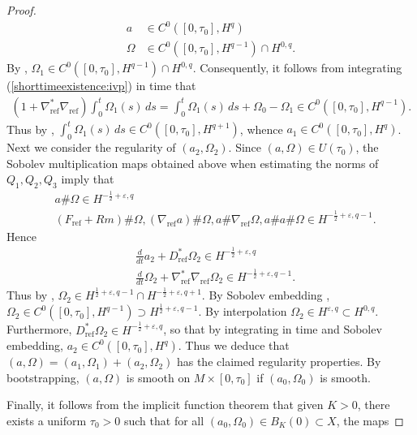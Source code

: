 \documentclass[12pt]{amsart}
\renewcommand{\1}{{\mathbf 1}}
\theoremstyle{others}
\numberwithin{equation}{section}
\begin{document}
\begin{proof}
\begin{align*}
    a &\in C^0([0, \tau_0], H^q) \\
    \Omega &\in C^0([0, \tau_0], H^{q-1}) \cap H^{0, q}.
\end{align*} By \cite[Prop. D.9]{radethesis}, \(\Omega_1 \in C^0([0, \tau_0], H^{q-1}) \cap H^{0, q}\). Consequently, it follows from integrating (\ref{shorttimeexistence:ivp}) in time that
\begin{align*}
    (1 + \nabla_{\text{ref}}^\ast \nabla_{\text{ref}})\int_0^t \Omega_1(s) \, ds = \int_0^t \Omega_1(s) \, ds + \Omega_0 - \Omega_1 \in C^0([0, \tau_0], H^{q-1}).
\end{align*} Thus by \cite[Prop. D.1]{radethesis}, \(\int_0^t \Omega_1(s) \, ds \in C^0([0, \tau_0], H^{q+1})\), whence \(a_1 \in C^0([0, \tau_0], H^q)\). Next we consider the regularity of \((a_2, \Omega_2)\). Since \((a, \Omega) \in U(\tau_0)\), the Sobolev multiplication maps obtained above when estimating the norms of \(Q_1, Q_2, Q_3\) imply that
\begin{align*}
    &a \# \Omega \in H^{-\frac{1}{2} + \varepsilon, q} \\
    & (F_{\text{ref}} + Rm)\# \Omega, (\nabla_{\text{ref}} a) \# \Omega, a \# \nabla_{\text{ref}} \Omega, a \# a \# \Omega \in H^{-\frac{1}{2} + \varepsilon, q-1}. 
\end{align*} Hence
\begin{align*}
    &\frac{d}{dt} a_2 + D_{\text{ref}}^\ast \Omega_2 \in H^{-\frac{1}{2} + \varepsilon, q} \\
    &\frac{d}{dt} \Omega_2 + \nabla_{\text{ref}}^\ast \nabla_{\text{ref}} \Omega_2 \in H^{-\frac{1}{2} + \varepsilon, q-1}.
\end{align*} Thus by \cite[Prop. D.8]{radethesis}, \(\Omega_2 \in  H^{\frac{1}{2} + \varepsilon, q-1} \cap  H^{-\frac{1}{2} + \varepsilon, q+1}\). By Sobolev embedding \cite[(74)]{radethesis}, \(\Omega_2 \in C^0([0, \tau_0], H^{q-1}) \supset  H^{\frac{1}{2} + \varepsilon, q-1}\). By interpolation \(\Omega_2 \in H^{\varepsilon, q} \subset H^{0, q}\). Furthermore, \(D_{\text{ref}}^\ast \Omega_2 \in H^{-\frac{1}{2} + \varepsilon, q}\), so that by integrating in time and Sobolev embedding, \(a_2 \in C^0([0, \tau_0], H^q)\). Thus we deduce that \((a, \Omega) = (a_1, \Omega_1) + (a_2, \Omega_2)\) has the claimed regularity properties. By bootstrapping, \((a, \Omega)\) is smooth on \(M \times [0, \tau_0]\) if \((a_0, \Omega_0)\) is smooth. \par
Finally, it follows from the implicit function theorem \cite[Proof of Lemma B.5, pg. 19]{radethesis} that given \(K > 0\), there exists a uniform \(\tau_0 > 0\) such that for all \((a_0, \Omega_0) \in B_K(0) \subset X\), the maps

\end{proof}
\end{document}
